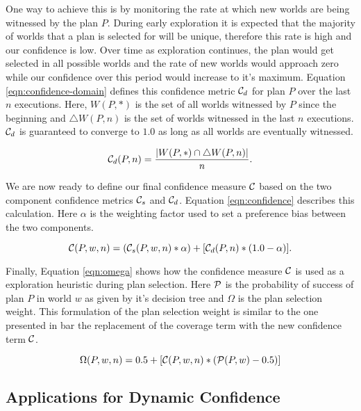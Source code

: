 One way to achieve this is by monitoring the rate at which new worlds are being witnessed by the plan $P$. During early exploration it is expected that the majority of worlds that a plan is selected for will be unique, therefore this rate is high and our confidence is low. Over time as exploration continues, the plan would get selected in all possible worlds and the rate of new worlds would approach zero while our confidence over this period would increase to it's maximum.  Equation \ref{eqn:confidence-domain} defines this confidence metric $\C_d$ for plan $P$ over the last $n$ executions. Here, $W(P,*)$ is the set of all worlds witnessed by $P$ since the beginning and $\triangle W(P,n)$ is the set of worlds witnessed in the last $n$ executions. $\C_d$ is guaranteed to converge to $1.0$ as long as all worlds are eventually witnessed.

\begin{equation}
\C_d(P,n) = \frac{|W(P,*)\cap \triangle W(P,n) |}{n}.
\label{eqn:confidence-domain}
\end{equation}

We are now ready to define our final confidence measure $\C$ based on the two component confidence metrics $\C_s$ and $\C_d$. Equation \ref{eqn:confidence} describes this calculation. Here $\alpha$ is the weighting factor used to set a preference bias between the two components.

\begin{equation}
\C(P,w,n) = (\C_s(P,w,n)*\alpha) + [\C_d(P,n)*(1.0-\alpha)].
\label{eqn:confidence}
\end{equation}

Finally, Equation \ref{eqn:omega} shows how the confidence measure $\C$ is used as a exploration heuristic during plan selection. Here $\P$ is the probability of success of plan $P$ in world $w$ as given by it's decision tree and $\Omega$ is the plan selection weight. This formulation of the plan selection weight is similar to the one presented in \cite{singh10:extending} bar the replacement of the coverage term with the new confidence term $\C$.

\begin{equation}
\Omega(P,w,n) = 0.5 + \left[  \C(P,w,n) *  \left( \P(P,w) - 0.5 \right)  \right]
\label{eqn:omega}   
\end{equation}


\subsection{Applications for Dynamic Confidence}

